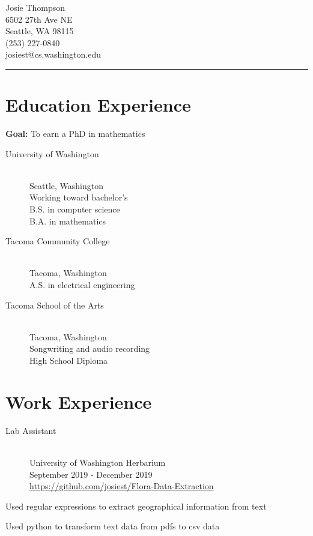 \documentclass[10pt]{article}
\newenvironment{itemize*}
{\begin{itemize}[leftmargin=*]
    \setlength{\itemsep}{0pt}
    \setlength{\parskip}{0pt}}
{\end{itemize}}
\begin{document}
\noindent
\parbox[t]{0.5\textwidth}{
    {\sffamily\Huge Josie Thompson}\medskip\\
    6502 27th Ave NE\\
    Seattle, WA 98115\\
    (253) 227-0840\\
    josiest@cs.washington.edu
}
\vspace{12pt}
\hrule

\begin{paracol}{2}
\section*{Education Experience}
\textbf{Goal:} To earn a PhD in mathematics
\begin{description}
\item[University of Washington]~\\
    Seattle, Washington\\
    Working toward bachelor's\\
    B.S. in computer science\\
    B.A. in mathematics
\item[Tacoma Community College]~\\
    Tacoma, Washington\\
    A.S. in electrical engineering
\item[Tacoma School of the Arts]~\\
    Tacoma, Washington\\
    Songwriting and audio recording\\
    High School Diploma
\end{description}
\section*{Work Experience}
\begin{description}
\item[Lab Assistant]~\\
    University of Washington Herbarium\\
    September 2019 - December 2019\\
    \url{https://github.com/josiest/Flora-Data-Extraction}
\end{description}
\begin{itemize*}
\item Used regular expressions to extract geographical information from text
\item Used python to transform text data from pdfs to csv data
\end{itemize*}


\end{paracol}
\end{document}
